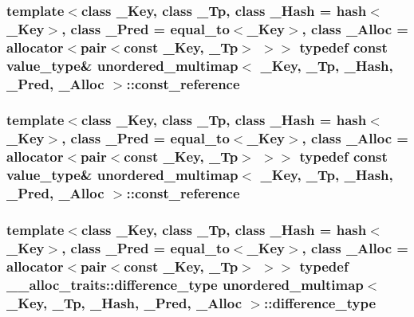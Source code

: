 \subsubsection[{const\+\_\+reference}]{\setlength{\rightskip}{0pt plus 5cm}template$<$class \+\_\+\+Key, class \+\_\+\+Tp, class \+\_\+\+Hash = hash$<$\+\_\+\+Key$>$, class \+\_\+\+Pred = equal\+\_\+to$<$\+\_\+\+Key$>$, class \+\_\+\+Alloc = allocator$<$pair$<$const \+\_\+\+Key, \+\_\+\+Tp$>$ $>$$>$ typedef const {\bf value\+\_\+type}\& {\bf unordered\+\_\+multimap}$<$ \+\_\+\+Key, \+\_\+\+Tp, \+\_\+\+Hash, \+\_\+\+Pred, \+\_\+\+Alloc $>$\+::{\bf const\+\_\+reference}}\label{classunordered__multimap_ab3aedd41dcc9c645d596c98ba3379826}
\hypertarget{classunordered__multimap_ab3aedd41dcc9c645d596c98ba3379826}{}
\subsubsection[{const\+\_\+reference}]{\setlength{\rightskip}{0pt plus 5cm}template$<$class \+\_\+\+Key, class \+\_\+\+Tp, class \+\_\+\+Hash = hash$<$\+\_\+\+Key$>$, class \+\_\+\+Pred = equal\+\_\+to$<$\+\_\+\+Key$>$, class \+\_\+\+Alloc = allocator$<$pair$<$const \+\_\+\+Key, \+\_\+\+Tp$>$ $>$$>$ typedef const {\bf value\+\_\+type}\& {\bf unordered\+\_\+multimap}$<$ \+\_\+\+Key, \+\_\+\+Tp, \+\_\+\+Hash, \+\_\+\+Pred, \+\_\+\+Alloc $>$\+::{\bf const\+\_\+reference}}\label{classunordered__multimap_ab3aedd41dcc9c645d596c98ba3379826}
\hypertarget{classunordered__multimap_ae01816b9f8883bc381dee433486054de}{}
\subsubsection[{difference\+\_\+type}]{\setlength{\rightskip}{0pt plus 5cm}template$<$class \+\_\+\+Key, class \+\_\+\+Tp, class \+\_\+\+Hash = hash$<$\+\_\+\+Key$>$, class \+\_\+\+Pred = equal\+\_\+to$<$\+\_\+\+Key$>$, class \+\_\+\+Alloc = allocator$<$pair$<$const \+\_\+\+Key, \+\_\+\+Tp$>$ $>$$>$ typedef \+\_\+\+\_\+alloc\+\_\+traits\+::difference\+\_\+type {\bf unordered\+\_\+multimap}$<$ \+\_\+\+Key, \+\_\+\+Tp, \+\_\+\+Hash, \+\_\+\+Pred, \+\_\+\+Alloc $>$\+::{\bf difference\+\_\+type}}\label{classunordered__multimap_ae01816b9f8883bc381dee433486054de}
\hypertarget{classunordered__multimap_ae01816b9f8883bc381dee433486054de}{}
